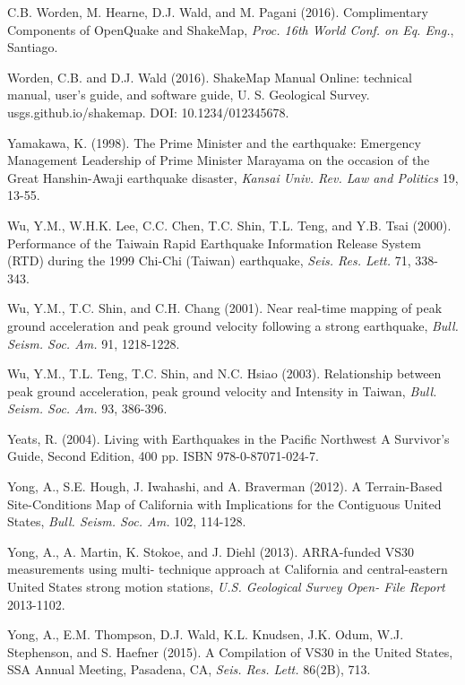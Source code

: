 \documentclass[letterpaper,10pt,english]{sphinxmanual}
\begin{document}
\label{references:worden2016}
C.B. Worden, M. Hearne, D.J. Wald, and M. Pagani (2016). Complimentary Components of OpenQuake and ShakeMap, \emph{Proc. 16th World Conf. on Eq. Eng.}, Santiago.

\label{references:worden2016b}
Worden, C.B. and D.J. Wald (2016). ShakeMap Manual Online: technical manual, user's guide, and software guide,
U. S. Geological Survey. usgs.github.io/shakemap. DOI: 10.1234/012345678.

\label{references:yamakawa1998}
Yamakawa, K. (1998). The Prime Minister and the earthquake: Emergency Management Leadership of
Prime Minister Marayama on the occasion of the Great Hanshin-Awaji earthquake disaster, \emph{Kansai
Univ. Rev. Law and Politics} 19, 13-55.

Wu, Y.M., W.H.K. Lee, C.C. Chen, T.C. Shin, T.L. Teng, and Y.B. Tsai (2000). Performance of the
Taiwain Rapid Earthquake Information Release System (RTD) during the 1999 Chi-Chi (Taiwan)
earthquake, \emph{Seis. Res. Lett.} 71, 338-343.

Wu, Y.M., T.C. Shin, and C.H. Chang (2001). Near real-time mapping of peak ground acceleration and
peak ground velocity following a strong earthquake, \emph{Bull. Seism. Soc. Am.} 91, 1218-1228.

\label{references:wu2003}
Wu, Y.M., T.L. Teng, T.C. Shin, and N.C. Hsiao (2003). Relationship between peak ground
acceleration, peak ground velocity and Intensity in Taiwan, \emph{Bull. Seism. Soc. Am.} 93, 386-396.

\label{references:yeats2004}
Yeats, R. (2004). Living with Earthquakes in the Pacific Northwest A
Survivor's Guide, Second Edition, 400 pp. ISBN 978-0-87071-024-7.

Yong, A., S.E. Hough, J. Iwahashi, and A. Braverman (2012). A Terrain-Based Site-Conditions Map of
California with Implications for the Contiguous United States, \emph{Bull. Seism. Soc. Am.} 102, 114-128.

Yong, A., A. Martin, K. Stokoe, and J. Diehl (2013). ARRA-funded VS30 measurements using multi-
technique approach at California and central-eastern United States strong motion stations, \emph{U.S. Geological Survey Open-
File Report} 2013-1102.

\label{references:yong2015}
Yong, A., E.M. Thompson, D.J. Wald, K.L. Knudsen, J.K. Odum, W.J. Stephenson, and S. Haefner
(2015). A Compilation of VS30 in the United States, SSA Annual Meeting, Pasadena, CA, \emph{Seis. Res. Lett.} 86(2B), 713.
\end{document}
